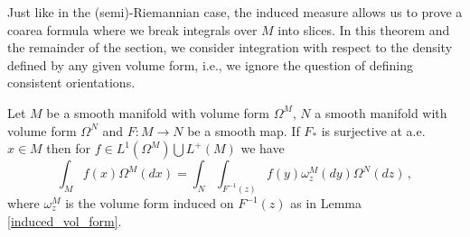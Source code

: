 Just like in the (semi)-Riemannian case, the induced measure allows us to prove a coarea formula where we break integrals over $M$ into slices. In this theorem and the remainder of the section, we consider integration with respect to the density defined by any given volume form, i.e., we ignore the question of defining consistent orientations.
\begin{theorem}\label{vol_form_coarea}
Let $M$ be a smooth manifold with volume form $\Omega^M$, $N$ a smooth manifold with volume form $\Omega^N$ and $F:M\rightarrow N$ be a smooth map.  If $F_*$ is surjective at a.e. $x\in M$ then for $f\in L^1(\Omega^M)\bigcup L^+(M)$ we have
\begin{equation}\label{coarea_formula}
\int_Mf(x) \Omega^M(dx)=\int_{N}\int_{F^{-1}(z)} f(y)\omega^M_z(dy) \Omega^N(dz)\,,
\end{equation}
where $\omega^M_z$ is the volume form induced on $F^{-1}(z)$ as in Lemma \ref{induced_vol_form}.
\end{theorem}

